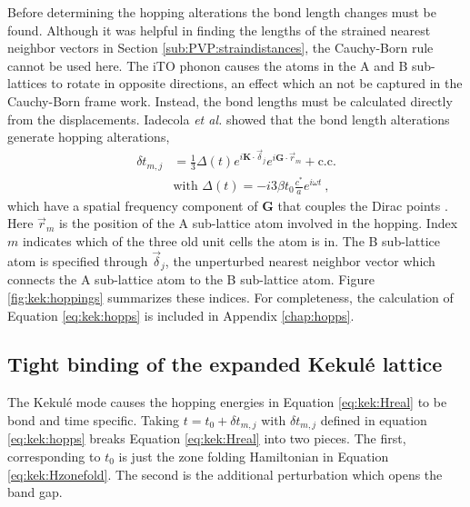 Before determining the hopping alterations the bond length changes must be found.
Although it was helpful in finding the lengths of the strained nearest neighbor vectors in Section \ref{sub:PVP:straindistances}, the Cauchy-Born rule cannot be used here.
The iTO phonon causes the atoms in the A and B sub-lattices to rotate in opposite directions, an effect which an not be captured in the Cauchy-Born frame work.
Instead, the bond lengths must be calculated directly from the displacements.
Iadecola \textit{et al.} showed that the bond length alterations generate hopping alterations,
\begin{align}
	\delta t_{m,j}&=\frac{1}{3} \Delta(t) e^{i \bm{K} \cdot \vec{\delta}_j} e^{i \bm{G} \cdot \vec{r}_{m}}+\text{c.c.} \nonumber \\
	& \text{with } \Delta(t)=-i 3 \beta t_0 \frac{c^*}{a} e^{i \omega t} \label{eq:kek:hopps} \ ,
\end{align}
which have a spatial frequency component of $\bm{G}$ that couples the Dirac points \cite{Iadecola2013}.
Here $\vec{r}_{m}$ is the position of the A sub-lattice atom involved in the hopping.
Index $m$ indicates which of the three old unit cells the atom is in.
The B sub-lattice atom is specified through $\vec{\delta}_j$, the unperturbed nearest neighbor vector which connects the A sub-lattice atom to the B sub-lattice atom.
Figure \ref{fig:kek:hoppings} summarizes these indices.
For completeness, the calculation of Equation \ref{eq:kek:hopps} is included in Appendix \ref{chap:hopps}.

\subsection{Tight binding of the expanded Kekul\'e lattice}

The Kekul\'e mode causes the hopping energies in Equation \ref{eq:kek:Hreal} to be bond and time specific.
Taking $t=t_0+\delta t_{m,j}$ with $\delta t_{m,j}$ defined in equation \ref{eq:kek:hopps} breaks Equation \ref{eq:kek:Hreal} into two pieces.
The first, corresponding to $t_0$ is just the zone folding Hamiltonian in Equation \ref{eq:kek:Hzonefold}.
The second is the additional perturbation which opens the band gap.

